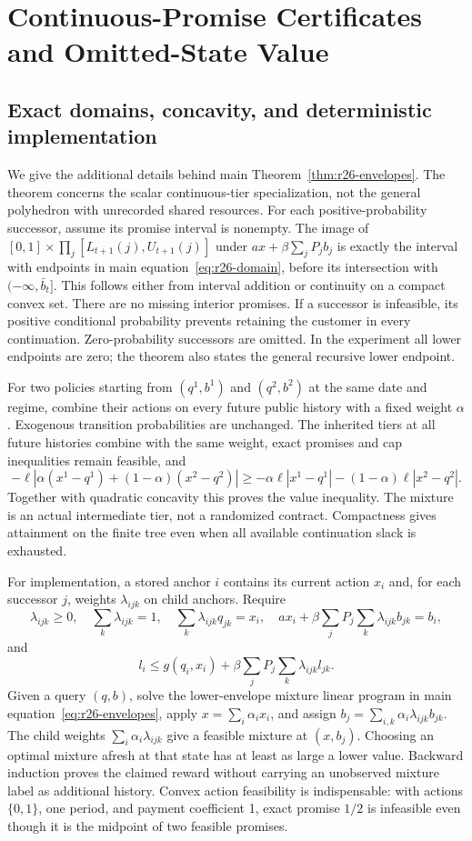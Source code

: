\section{Continuous-Promise Certificates and Omitted-State Value}\label{ec:r26}
\subsection{Exact domains, concavity, and deterministic implementation}
We give the additional details behind main Theorem~\ref{thm:r26-envelopes}. The theorem concerns the scalar continuous-tier specialization, not the general polyhedron with unrecorded shared resources. For each positive-probability successor, assume its promise interval is nonempty. The image of $[0,1]\times\prod_j[L_{t+1}(j),U_{t+1}(j)]$ under $a x+\beta\sum_jP_jb_j$ is exactly the interval with endpoints in main equation~\eqref{eq:r26-domain}, before its intersection with $(-\infty,\bar b_t]$. This follows either from interval addition or continuity on a compact convex set. There are no missing interior promises. If a successor is infeasible, its positive conditional probability prevents retaining the customer in every continuation. Zero-probability successors are omitted. In the experiment all lower endpoints are zero; the theorem also states the general recursive lower endpoint.

For two policies starting from $(q^1,b^1)$ and $(q^2,b^2)$ at the same date and regime, combine their actions on every future public history with a fixed weight $\alpha$. Exogenous transition probabilities are unchanged. The inherited tiers at all future histories combine with the same weight, exact promises and cap inequalities remain feasible, and
\[
 -\ell|\alpha(x^1-q^1)+(1-\alpha)(x^2-q^2)|
 \geq-\alpha\ell|x^1-q^1|-(1-\alpha)\ell|x^2-q^2|.
\]
Together with quadratic concavity this proves the value inequality. The mixture is an actual intermediate tier, not a randomized contract. Compactness gives attainment on the finite tree even when all available continuation slack is exhausted.

For implementation, a stored anchor $i$ contains its current action $x_i$ and, for each successor $j$, weights $\lambda_{ijk}$ on child anchors. Require
\[
 \lambda_{ijk}\geq0,\quad\sum_k\lambda_{ijk}=1,\quad
 \sum_k\lambda_{ijk}q_{jk}=x_i,\quad
 a x_i+\beta\sum_jP_j\sum_k\lambda_{ijk}b_{jk}=b_i,
\]
and
\[
 l_i\leq g(q_i,x_i)+\beta\sum_jP_j\sum_k\lambda_{ijk}l_{jk}.
\]
Given a query $(q,b)$, solve the lower-envelope mixture linear program in main equation~\eqref{eq:r26-envelopes}, apply $x=\sum_i\alpha_i x_i$, and assign
$b_j=\sum_{i,k}\alpha_i\lambda_{ijk}b_{jk}$. The child weights $\sum_i\alpha_i\lambda_{ijk}$ give a feasible mixture at $(x,b_j)$. Choosing an optimal mixture afresh at that state has at least as large a lower value. Backward induction proves the claimed reward without carrying an unobserved mixture label as additional history. Convex action feasibility is indispensable: with actions $\{0,1\}$, one period, and payment coefficient 1, exact promise $1/2$ is infeasible even though it is the midpoint of two feasible promises.

